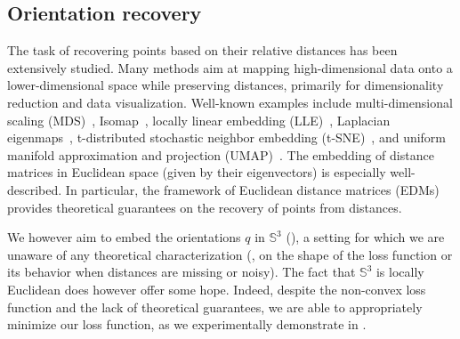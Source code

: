 \subsection{Orientation recovery}\label{sec:method:orientation-recovery}

The task of recovering points based on their relative distances has been extensively studied.
Many methods aim at mapping high-dimensional data onto a lower-dimensional space while preserving distances, primarily for dimensionality reduction and data visualization.
Well-known examples include multi-dimensional scaling (MDS)~\cite{cox2008mds}, Isomap~\cite{tenenbaum2000isomap}, locally linear embedding (LLE)~\cite{roweis2000lle}, Laplacian eigenmaps~\cite{belkin2003laplacian}, t-distributed stochastic neighbor embedding (t-SNE)~\cite{maaten2008tsne}, and uniform manifold approximation and projection (UMAP)~\cite{mcinnes2018umap}.
The embedding of distance matrices in Euclidean space (given by their eigenvectors) is especially well-described.
In particular, the framework of Euclidean distance matrices (EDMs)~\cite{dokmanic2015edm} provides theoretical guarantees on the recovery of points from distances.

We however aim to embed the orientations $q$ in $\mathbb{S}^3$ (), a setting for which we are unaware of any theoretical characterization (\eg, on the shape of the loss function or its behavior when distances are missing or noisy).
The fact that $\mathbb{S}^3$ is locally Euclidean does however offer some hope. %
Indeed, despite the non-convex loss function and the lack of theoretical guarantees, we are able to appropriately minimize our loss function, as we experimentally demonstrate in .

